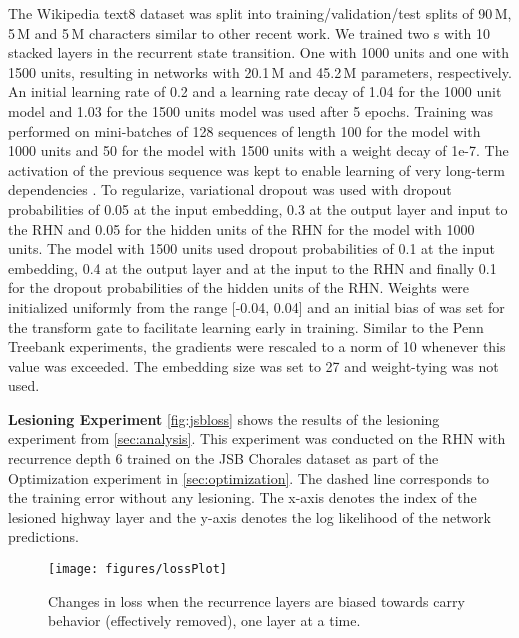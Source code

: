 \documentclass[letterpaper]{article}
\begin{document}
The Wikipedia text8 dataset \citep{hutter_prize} was split into training/validation/test splits of 90\,M, 5\,M and 5\,M characters similar to other recent work.
We trained two \arch{}s with 10 stacked layers in the recurrent state transition. One with 1000 units and one with 1500 units, resulting in networks with 20.1\,M and 45.2\,M parameters, respectively. 
An initial learning rate of 0.2 and a learning rate decay of 1.04 for the 1000 unit model and 1.03 for the 1500 units model was used after 5 epochs. 
Training was performed on mini-batches of 128 sequences of length 100 for the model with 1000 units and 50 for the model with 1500 units with a weight decay of 1e-7.
The activation of the previous sequence was kept to enable learning of very long-term dependencies \citep{graves_generating_sequences}. 
To regularize, variational dropout \citep{gal2015} was used with dropout probabilities of 0.05 at the input embedding, 0.3 at the output layer and input to the RHN and 0.05 for the hidden units of the RHN for the model with 1000 units. The model with 1500 units used dropout probabilities of 0.1 at the input embedding, 0.4 at the output layer and at the input to the RHN and finally 0.1 for the dropout probabilities of the hidden units of the RHN.
Weights were initialized uniformly from the range [-0.04, 0.04] and an initial bias of  was set for the transform gate to facilitate learning early in training. 
Similar to the Penn Treebank experiments, the gradients were rescaled to a norm of 10 whenever this value was exceeded. The embedding size was set to 27 and weight-tying \citep{weight_tying} was not used. 

\textbf{Lesioning Experiment}
\autoref{fig:jsbloss} shows the results of the lesioning experiment from \autoref{sec:analysis}.
This experiment was conducted on the RHN with recurrence depth 6 trained on the JSB Chorales dataset as part of the Optimization experiment in \autoref{sec:optimization}.
The dashed line corresponds to the training error without any lesioning.
The x-axis denotes the index of the lesioned highway layer and the y-axis denotes the log likelihood of the network predictions.

\begin{figure*}[t] \begin{center}         \texttt{[image: figures/lossPlot]}
\caption{Changes in loss when the recurrence layers are biased towards carry behavior (effectively removed), one layer at a time.}
\label{fig:jsbloss}
\end{center}
\end{figure*}
\end{document}
